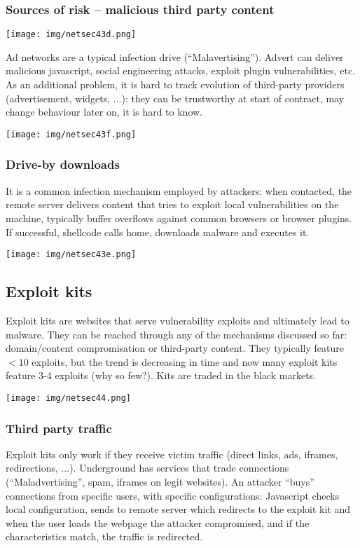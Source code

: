 \documentclass[a4paper, 10pt, titlepage]{article}
\begin{document}
\subsubsection*{Sources of risk – malicious third party content}
\begin{center}
	\texttt{[image: img/netsec43d.png]}
\end{center}
Ad networks are a typical infection drive (“Malavertising”). 
Advert can deliver malicious javascript, social engineering attacks, exploit plugin vulnerabilities, etc. As an additional problem, it is hard to track evolution of third-party providers (advertisement, widgets, ...): they can be trustworthy at start of contract, may change behaviour later on, it is hard to know.
\begin{center}
	\texttt{[image: img/netsec43f.png]}
\end{center}

\subsubsection*{Drive-by downloads} %
It is a common infection mechanism employed by attackers: when contacted, the remote server delivers content that tries to exploit local vulnerabilities on the machine, typically buffer overflows against common browsers or browser plugins. If successful, shellcode calls home, downloads malware and executes it.
\begin{center}
	\texttt{[image: img/netsec43e.png]}
\end{center}

\subsection{Exploit kits}
Exploit kits are websites that serve vulnerability exploits and ultimately lead to malware. They can be reached through any of the mechanisms discussed so far: domain/content compromisation or third-party content. They typically feature $<10$ exploits, but the trend is decreasing in time and now many exploit kits feature 3-4 exploits (why so few?). Kits are traded in the black markets.
\begin{center}
	\texttt{[image: img/netsec44.png]}
\end{center}

\subsubsection*{Third party traffic}
Exploit kits only work if they receive victim traffic (direct links, ads, iframes, redirections, ...). Underground has services that trade connections (“Maladvertising”, spam, iframes on legit websites). An attacker “buys” connections from specific users, with specific configurations: Javascript checks local configuration, sends to remote server which redirects to the exploit kit and when the user loads the webpage the attacker compromised, and if the characteristics match, the traffic is redirected.
\end{document}
